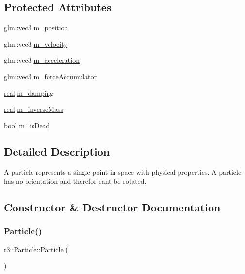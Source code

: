 \subsection*{Protected Attributes}
\begin{DoxyCompactItemize}
\item 
glm\+::vec3 \mbox{\hyperlink{classr3_1_1_particle_ab7f5aa7cf48278441aab18db1a0c1ba9}{m\+\_\+position}}
\item 
glm\+::vec3 \mbox{\hyperlink{classr3_1_1_particle_a037d73e42df0c7bb9f1ae79b37301477}{m\+\_\+velocity}}
\item 
glm\+::vec3 \mbox{\hyperlink{classr3_1_1_particle_aa6c9d639f87a9291c60165c057e05a4f}{m\+\_\+acceleration}}
\item 
glm\+::vec3 \mbox{\hyperlink{classr3_1_1_particle_accfbf52627c85fa26c4df442873df497}{m\+\_\+force\+Accumulator}}
\item 
\mbox{\hyperlink{namespacer3_ab2016b3e3f743fb735afce242f0dc1eb}{real}} \mbox{\hyperlink{classr3_1_1_particle_a68034523bad4d9e4023f69b849197eb3}{m\+\_\+damping}}
\item 
\mbox{\hyperlink{namespacer3_ab2016b3e3f743fb735afce242f0dc1eb}{real}} \mbox{\hyperlink{classr3_1_1_particle_aad38f3126d055c2677ffe8f08089fc5c}{m\+\_\+inverse\+Mass}}
\item 
bool \mbox{\hyperlink{classr3_1_1_particle_a0a04ce870abc9017f09c2564344fda82}{m\+\_\+is\+Dead}}
\end{DoxyCompactItemize}


\subsection{Detailed Description}
A particle represents a single point in space with physical properties. A particle has no orientation and therefor can\textquotesingle{}t be rotated. 

\subsection{Constructor \& Destructor Documentation}
\mbox{\label{classr3_1_1_particle_a72d4ae82278e293bf0933a1aabbe9ac3}} 
\subsubsection{\texorpdfstring{Particle()}{Particle()}\hspace{0.1cm}{\footnotesize\ttfamily [1/2]}}
{\footnotesize\ttfamily r3\+::\+Particle\+::\+Particle (\begin{DoxyParamCaption}{ }\end{DoxyParamCaption})\hspace{0.3cm}{\ttfamily [explicit]}}

